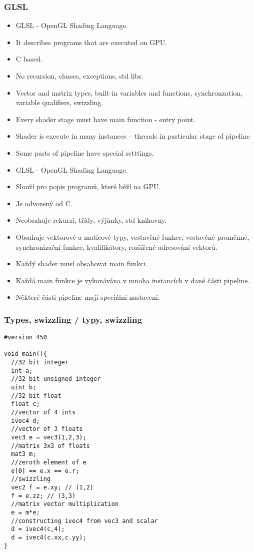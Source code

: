 \begin{frame}\frametitle{GLSL}\scriptsize
\begin{itemize}
  \item GLSL - OpenGL Shading Language.
  \item It describes programs that are executed on GPU.
  \item C based.
  \item No recursion, classes, exceptions, std libs.
  \item Vector and matrix types, built-in variables and functions, synchronzation, variable qualifiers, swizzling.
  \item Every shader stage must have main function - entry point.
  \item Shader is execute in many instances -- threads in particular stage of pipeline
  \item Some parts of pipeline have special setttings.
\end{itemize}

\begin{itemize}
  \item GLSL - OpenGL Shading Language.
  \item Slouží pro popis programů, které běží na GPU.
  \item Je odvozený od C.
  \item Neobsahuje rekurzi, třídy, výjimky, std knihovny.
  \item Obsahuje vektorové a maticové typy, vestavěné funkce, vestavěné proměnné, synchronizační funkce, kvalifikátory, rozšířené adresování vektorů.
  \item Každý shader musí obsahovat main funkci.
  \item Každá main funkce je vykonávána v mnoha instancích v dané části pipeline.
  \item Některé části pipeline mají speciální nastavení.
\end{itemize}
\end{frame}

\begin{frame}[fragile]\frametitle{Types, swizzling / typy, swizzling}\scriptsize
\begin{verbatim}
#version 450

void main(){
  //32 bit integer
  int a;
  //32 bit unsigned integer
  uint b;
  //32 bit float
  float c;
  //vector of 4 ints
  ivec4 d;
  //vector of 3 floats
  vec3 e = vec3(1,2,3);
  //matrix 3x3 of floats
  mat3 m;
  //zeroth element of e
  e[0] == e.x == e.r;
  //swizzling 
  vec2 f = e.xy; // (1,2)
  f = e.zz; // (3,3)
  //matrix vector multiplication
  e = m*e;
  //constructing ivec4 from vec3 and scalar
  d = ivec4(c,4);
  d = ivec4(c.xx,c.yy);
}
\end{verbatim}
\end{frame}

